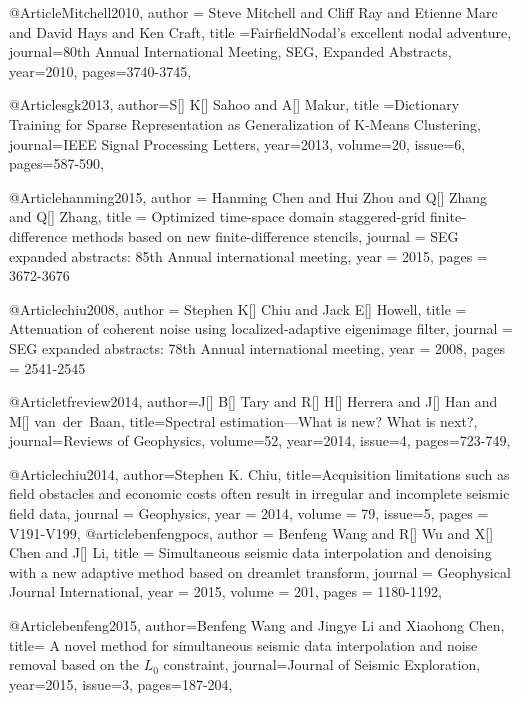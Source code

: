 @Article{Mitchell2010,
  author = {Steve Mitchell and Cliff Ray and Etienne Marc and David Hays and Ken Craft},
  title ={FairfieldNodal's excellent nodal adventure},
  journal={80th Annual International Meeting, SEG, Expanded Abstracts},
  year=2010,
  pages={3740-3745},
}

@Article{sgk2013,
  author={S[] K[] Sahoo and A[] Makur},
  title ={Dictionary Training	for	Sparse Representation as Generalization	of K-Means Clustering},
  journal={IEEE Signal Processing Letters},
  year=2013,
  volume=20,
  issue=6,
  pages={587-590},
}


@Article{hanming2015,
  author = 	 {Hanming Chen and Hui Zhou and Q[] Zhang and Q[] Zhang},
  title = 	 {Optimized time-space domain staggered-grid finite-difference methods based on new finite-difference stencils},
  journal = 	 {SEG expanded abstracts: 85th Annual international meeting},
  year = 	 2015,
  pages =	 {3672-3676}
}

@Article{chiu2008,
  author = 	 {Stephen K[] Chiu and Jack E[] Howell},
  title = 	 {Attenuation of coherent noise using localized‐adaptive eigenimage filter},
  journal = 	 {SEG expanded abstracts: 78th Annual international meeting},
  year = 	 2008,
  pages =	 {2541-2545}
}



@Article{tfreview2014,
author={J[] B[] Tary and R[] H[] Herrera and J[] Han and M[] van~der~Baan},
title={Spectral estimation—What is new? What is next?},
journal={Reviews of Geophysics},
volume=52,
year=2014,
issue=4,
pages={723-749},
}

@Article{chiu2014,
  author={Stephen K. Chiu},
  title={Acquisition limitations such as field obstacles and economic costs often result in irregular and incomplete seismic field data},
  journal = 	 {Geophysics},
  year = 	 2014,
  volume =	 79,
  issue=5,
  pages =	 {V191-V199},
}
@article{benfengpocs,
  author =	 {Benfeng Wang and R[] Wu and X[] Chen and J[] Li},
  title =	 {Simultaneous seismic data interpolation and denoising with a new adaptive method based on dreamlet transform},
  journal = 	 {Geophysical Journal International},
  year = 	 2015,
  volume =	 201,
  pages =	 {1180-1192},
}

@Article{benfeng2015,
  author={Benfeng Wang and Jingye Li and Xiaohong Chen},
  title={ A novel method for simultaneous seismic data interpolation and noise removal based on the $L_0$ constraint},
  journal={Journal of Seismic Exploration},
  year=2015,
  issue=3,
  pages={187-204},
}

